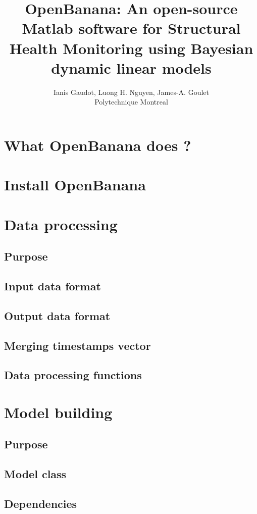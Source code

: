 \documentclass{book}
\title{OpenBanana: An open-source Matlab software for Structural Health Monitoring using Bayesian dynamic linear models}
\author{Ianis Gaudot, Luong H. Nguyen, James-A. Goulet \\ Polytechnique Montreal}
\begin{document}
\maketitle

\tableofcontents

\chapter{What OpenBanana does ?}
\newpage

\chapter{Install OpenBanana}
\newpage

\chapter{Data processing}
\section{Purpose}
\section{Input data format}
\section{Output data format}
\section{Merging timestamps vector}
\section{Data processing functions}
\newpage

\chapter{Model building}
\section{Purpose}
\section{Model class}
\section{Dependencies}
\end{document}
